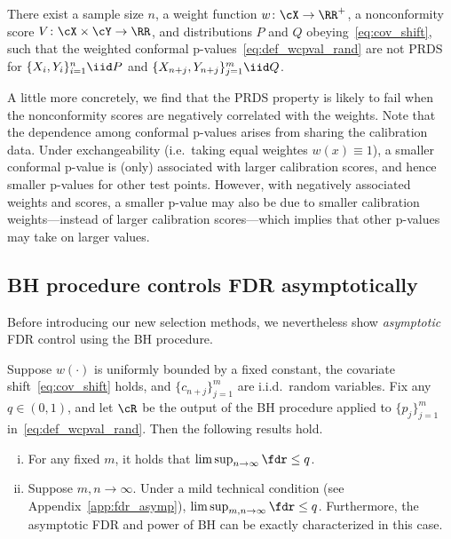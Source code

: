 \begin{prop}\label{prop:counter_PRDS}
There exist a sample size $n$, a weight function $w\colon \cX\to \RR^+$,
a nonconformity score $V\colon \cX\times\cY\to \RR$,
and  distributions $P$ and $Q$ obeying~\eqref{eq:cov_shift},
such that
the weighted conformal p-values~\eqref{eq:def_wcpval_rand} are not PRDS for
$\{X_i,Y_i\}_{i=1}^n\iid P$ and $\{X_{n+j},Y_{n+j}\}_{j=1}^m\iid Q$.
\end{prop}

A little more concretely, we find that the PRDS property
is likely to fail when
the nonconformity scores are negatively
correlated with the
weights.
Note that the dependence among conformal p-values
arises from sharing the calibration data.
Under exchangeability (i.e.~taking equal weightes $w(x)\equiv 1$), a smaller conformal p-value
is (only) associated with larger calibration scores,
and hence smaller p-values for other test points.
However, with negatively associated  weights and scores,
a smaller p-value may also be due to
smaller calibration weights---instead of larger calibration scores---which
implies that other p-values may take on larger values.


\subsection{BH procedure controls FDR asymptotically}


Before introducing our new selection methods,
we nevertheless show {\em asymptotic} FDR control using the BH procedure.

\begin{theorem}\label{thm:fdr_asymp}
Suppose $w(\cdot)$ is uniformly bounded by a fixed constant, the covariate shift~\eqref{eq:cov_shift} holds,
and $\{c_{n+j}\}_{j=1}^m$ are i.i.d.~random variables.
Fix any $q\in(0,1)$,
and let $\cR$ be the output of the BH procedure applied to
$\{p_j\}_{j=1}^m$ in~\eqref{eq:def_wcpval_rand}.
Then the following  results hold.
\begin{enumerate}[(i)]
\item For any fixed $m$,
it holds   that $\limsup_{n\to \infty} \fdr \leq q$.
\item Suppose $m,n\to \infty$. Under a mild technical condition (see Appendix~\ref{app:fdr_asymp}), $\limsup_{m,n\to\infty} \fdr \leq q$. Furthermore, the asymptotic FDR and power of BH  can be exactly characterized in this case.
\end{enumerate}
\end{theorem}


